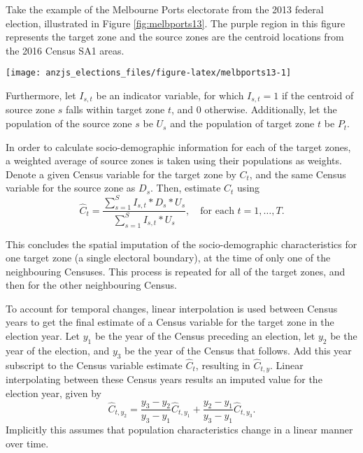 \documentclass[times, doublespace]{anzsauth}
\let\origfigure\figure
\let\endorigfigure\endfigure
\renewenvironment{figure}[1][2] {
    \expandafter\origfigure\expandafter[htbp]
} {
    \endorigfigure
}
\begin{document}
Take the example of the Melbourne Ports electorate from the 2013 federal election, illustrated in Figure \ref{fig:melbports13}. The purple region in this figure represents the target zone and the source zones are the centroid locations from the 2016 Census SA1 areas.

\begin{figure}[h]

{\centering \texttt{[image: anzjs\_elections\_files/figure-latex/melbports13-1]} 

}

\caption{The electoral boundaries for Melbourne Ports (shown in purple) and surrounding electorates, with centroids for Statistical Area 1 regions from the 2016 Census overlaid. The centroids falling within the purple region are attributed to Melbourne Ports.}\label{fig:melbports13}
\end{figure}

Furthermore, let \(I_{s,t}\) be an indicator variable, for which \(I_{s,t} = 1\) if the centroid of source zone \(s\) falls within target zone \(t\), and \(0\) otherwise. Additionally, let the population of the source zone \(s\) be \(U_s\) and the population of target zone \(t\) be \(P_{t}\).

In order to calculate socio-demographic information for each of the target zones, a weighted average of source zones is taken using their populations as weights. Denote a given Census variable for the target zone by \(C_t\), and the same Census variable for the source zone as \(D_s\). Then, estimate \(C_t\) using
\[
  \hat{C}_t = \frac{\sum_{s=1}^{S}{I_{s,t}*D_s*U_s}}%
  {\sum_{s=1}^{S}{I_{s,t}*U_s}},
  \quad\text{for each $t=1,\dots,T$}.
\]

This concludes the spatial imputation of the socio-demographic characteristics for one target zone (a single electoral boundary), at the time of only one of the neighbouring Censuses. This process is repeated for all of the target zones, and then for the other neighbouring Census.

\enlargethispage*{0.5cm}

To account for temporal changes, linear interpolation is used between Census years to get the final estimate of a Census variable for the target zone in the election year. Let \(y_1\) be the year of the Census preceding an election, let \(y_2\) be the year of the election, and \(y_3\) be the year of the Census that follows. Add this year subscript to the Census variable estimate \(\hat{C}_t\), resulting in \(\hat{C}_{t,y}\). Linear interpolating between these Census years results an imputed value for the election year, given by
\[
  \hat{C}_{t,y_2} = \frac{y_3-y_2}{y_3-y_1} \hat{C}_{t,y_1} +
    \frac{y_2-y_1}{y_3-y_1} \hat{C}_{t,y_3}.
\]
Implicitly this assumes that population characteristics change in a linear manner over time.
\end{document}
